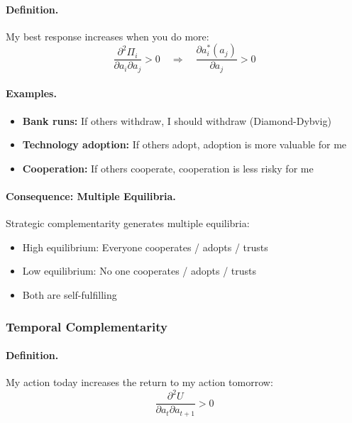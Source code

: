 \documentclass[12pt,a4paper]{article}
\begin{document}
\paragraph{Definition.}
My best response increases when you do more:
\begin{equation}
  \frac{\partial^2 \Pi_i}{\partial a_i \partial a_j} > 0
  \quad \Rightarrow \quad
  \frac{\partial a_i^*(a_j)}{\partial a_j} > 0
\end{equation}

\paragraph{Examples.}
\begin{itemize}
  \item \textbf{Bank runs:} If others withdraw, I should withdraw (Diamond-Dybvig)
  \item \textbf{Technology adoption:} If others adopt, adoption is more valuable for me
  \item \textbf{Cooperation:} If others cooperate, cooperation is less risky for me
\end{itemize}

\paragraph{Consequence: Multiple Equilibria.}
Strategic complementarity generates multiple equilibria:
\begin{itemize}
  \item High equilibrium: Everyone cooperates / adopts / trusts
  \item Low equilibrium: No one cooperates / adopts / trusts
  \item Both are self-fulfilling
\end{itemize}

\subsubsection{Temporal Complementarity}

\paragraph{Definition.}
My action today increases the return to my action tomorrow:
\begin{equation}
  \frac{\partial^2 U}{\partial a_t \partial a_{t+1}} > 0
\end{equation}
\end{document}
